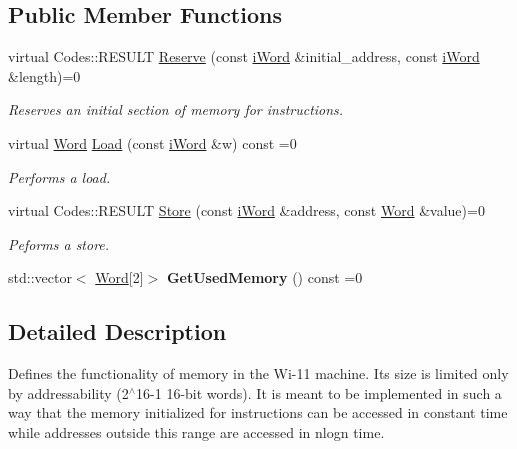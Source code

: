 \subsection*{Public Member Functions}
\begin{DoxyCompactItemize}
\item 
virtual Codes::RESULT \hyperlink{classiMemory_a27750e74d09fb473c163a4cc4c3e697b}{Reserve} (const \hyperlink{classiWord}{iWord} \&initial\_\-address, const \hyperlink{classiWord}{iWord} \&length)=0
\begin{DoxyCompactList}\small\item\em Reserves an initial section of memory for instructions. \item\end{DoxyCompactList}\item 
virtual \hyperlink{classWord}{Word} \hyperlink{classiMemory_a3352ba391fc9b69a0b8691b2d585596a}{Load} (const \hyperlink{classiWord}{iWord} \&w) const =0
\begin{DoxyCompactList}\small\item\em Performs a load. \item\end{DoxyCompactList}\item 
virtual Codes::RESULT \hyperlink{classiMemory_a2632c9999797b0799a7d6b0a59bfa91a}{Store} (const \hyperlink{classiWord}{iWord} \&address, const \hyperlink{classWord}{Word} \&value)=0
\begin{DoxyCompactList}\small\item\em Peforms a store. \item\end{DoxyCompactList}\item 
\hypertarget{classiMemory_aa9b57e00c0099963ab28489008d612e8}{
std::vector$<$ \hyperlink{classWord}{Word}\mbox{[}2\mbox{]}$>$ {\bfseries GetUsedMemory} () const =0}
\label{classiMemory_aa9b57e00c0099963ab28489008d612e8}

\end{DoxyCompactItemize}


\subsection{Detailed Description}
Defines the functionality of memory in the Wi-\/11 machine. Its size is limited only by addressability (2$^\wedge$16-\/1 16-\/bit words). It is meant to be implemented in such a way that the memory initialized for instructions can be accessed in constant time while addresses outside this range are accessed in nlogn time. 

